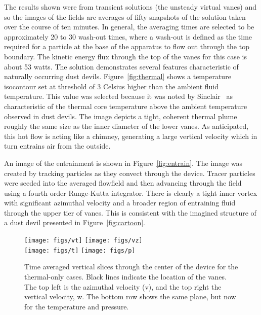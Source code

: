 The results shown were from transient solutions (the unsteady virtual
vanes) and so the images of the fields are averages of fifty snapshots
of the solution taken over the course of ten minutes. In general, the
averaging times are selected to be approximately 20 to 30 wash-out
times, where a wash-out is defined as the time required for a particle
at the base of the apparatus to flow out through the top boundary. The
kinetic energy flux through the top of the vanes for this case is about
53 watts. The solution demonstrates several features characteristic of
naturally occurring dust devils. Figure~\ref{fig:thermal} shows a
temperature isocontour set at threshold of 3 Celsius higher than the
ambient fluid temperature. This value was selected because it was noted
by Sinclair~\cite{Sinclair1969} as characteristic of the thermal core 
temperature above the ambient temperature observed in dust devils. The
image depicts a tight, coherent thermal plume roughly the same size as
the inner diameter of the lower vanes. As anticipated, this hot flow is
acting like a chimney, generating a large vertical velocity which in
turn entrains air from the outside.  

An image of the entrainment is shown in Figure~\ref{fig:entrain}. The
image was created by tracking particles as they convect through the
device. Tracer particles were seeded into the averaged flowfield and
then advancing through the field using a fourth order Runge-Kutta integrator.  
There is clearly a tight inner vortex with significant azimuthal
velocity and a broader region of entraining fluid through the upper tier
of vanes. This is consistent with the imagined structure of a dust devil
presented in Figure~\ref{fig:cartoon}.    

\begin{figure}[htb]

 \centering
 \texttt{[image: figs/vt]}
 \hfill
  \texttt{[image: figs/vz]}
 \\
  \centering
  \texttt{[image: figs/t]}
 \hfill
 \texttt{[image: figs/p]}
 \caption{Time averaged vertical slices through the center of the device
 for the thermal-only cases. Black lines indicate the location of the
 vanes. The top left is the azimuthal velocity (v), and the top right
 the vertical velocity, w. The bottom row shows the same plane, but now for the
 temperature and pressure.} 
 \label{fig:to-vert}
\end{figure}

